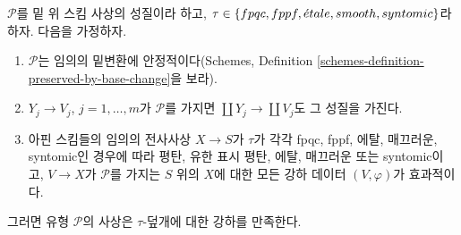 \begin{lemma}
\label{lemma-descending-types-morphisms}
$\mathcal{P}$를 밑 위 스킴 사상의 성질이라 하고,
$\tau \in \{fpqc, fppf, {\acute{e}tale}, smooth, syntomic\}$라 하자. 다음을
가정하자.
\begin{enumerate}
\item $\mathcal{P}$는 임의의 밑변환에 안정적이다(Schemes, Definition
\ref{schemes-definition-preserved-by-base-change}을 보라).
\item $Y_j \to V_j$, $j = 1, \ldots, m$가 $\mathcal{P}$를 가지면
$\coprod Y_j \to \coprod V_j$도 그 성질을 가진다.
\item 아핀 스킴들의 임의의 전사사상 $X \to S$가 $\tau$가 각각 fpqc,
fppf, 에탈, 매끄러운, syntomic인 경우에 따라 평탄, 유한 표시 평탄,
에탈, 매끄러운 또는 syntomic이고, $V \to X$가 $\mathcal{P}$를 가지는
$S$ 위의 $X$에 대한 모든 강하 데이터 $(V, \varphi)$가 효과적이다.
\end{enumerate}
그러면 유형 $\mathcal{P}$의 사상은 $\tau$-덮개에 대한 강하를 만족한다.
\end{lemma}

